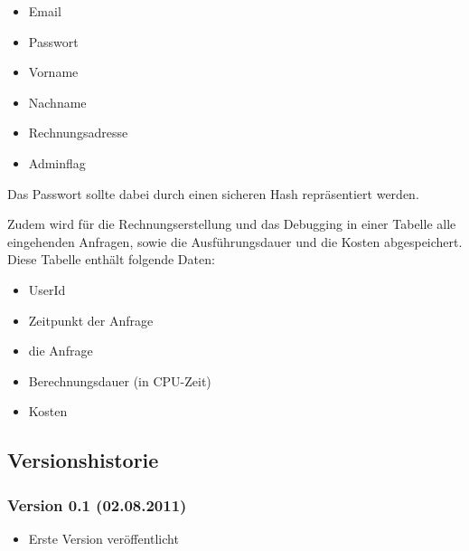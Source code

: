 \documentclass[ngerman]{scrartcl}
\begin{document}
	\begin{itemize}
		\item Email
		\item Passwort
		\item Vorname
		\item Nachname
		\item Rechnungsadresse
		\item Adminflag
	\end{itemize}
	
	Das Passwort sollte dabei durch einen sicheren Hash repräsentiert werden.
	
	Zudem wird für die Rechnungserstellung und das Debugging in einer Tabelle alle eingehenden Anfragen, sowie die Ausführungsdauer und die Kosten abgespeichert.
	Diese Tabelle enthält folgende Daten:
	
	\begin{itemize}
		\item UserId
		\item Zeitpunkt der Anfrage
		\item die Anfrage
		\item Berechnungsdauer (in CPU-Zeit)
		\item Kosten
	\end{itemize}	

	\subsection{Versionshistorie}
	
	\subsubsection*{Version 0.1 (02.08.2011)}

	\begin{itemize}
		\item Erste Version veröffentlicht
	\end{itemize}
\end{document}
